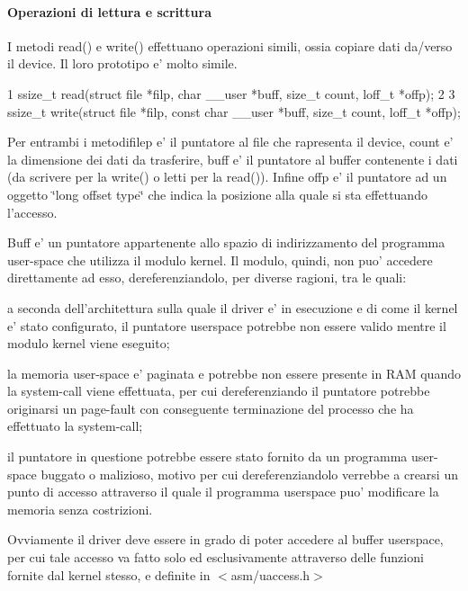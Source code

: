 \paragraph*{Operazioni di lettura e scrittura}

I metodi read() e write() effettuano operazioni simili, ossia copiare dati da/verso il device. Il loro prototipo e' molto simile.


\begin{DoxyCode}
1 ssize\_t read(struct file *filp, char \_\_user *buff, size\_t count, loff\_t *offp);
2 
3 ssize\_t write(struct file *filp, const char \_\_user *buff, size\_t count, loff\_t *offp);
\end{DoxyCode}


Per entrambi i metodifilep e' il puntatore al file che rapresenta il device, count e' la dimensione dei dati da trasferire, buff e' il puntatore al buffer contenente i dati (da scrivere per la write() o letti per la read()). Infine offp e' il puntatore ad un oggetto \char`\"{}long offset type\char`\"{} che indica la posizione alla quale si sta effettuando l'accesso.

Buff e' un puntatore appartenente allo spazio di indirizzamento del programma user-\/space che utilizza il modulo kernel. Il modulo, quindi, non puo' accedere direttamente ad esso, dereferenziandolo, per diverse ragioni, tra le quali\+:
\begin{DoxyItemize}
\item a seconda dell'architettura sulla quale il driver e' in esecuzione e di come il kernel e' stato configurato, il puntatore userspace potrebbe non essere valido mentre il modulo kernel viene eseguito;
\item la memoria user-\/space e' paginata e potrebbe non essere presente in R\+A\+M quando la system-\/call viene effettuata, per cui dereferenziando il puntatore potrebbe originarsi un page-\/fault con conseguente terminazione del processo che ha effettuato la system-\/call;
\item il puntatore in questione potrebbe essere stato fornito da un programma user-\/space buggato o malizioso, motivo per cui dereferenziandolo verrebbe a crearsi un punto di accesso attraverso il quale il programma userspace puo' modificare la memoria senza costrizioni.
\end{DoxyItemize}

Ovviamente il driver deve essere in grado di poter accedere al buffer userspace, per cui tale accesso va fatto solo ed esclusivamente attraverso delle funzioni fornite dal kernel stesso, e definite in $<$asm/uaccess.\+h$>$


